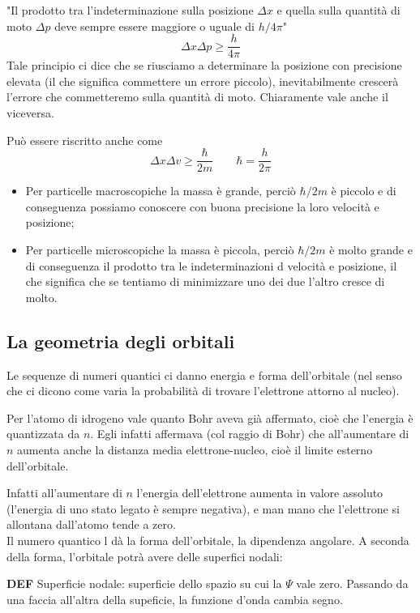 "Il prodotto tra l'indeterminazione sulla posizione $\Delta x$ e quella sulla quantità di moto $\Delta p$ deve sempre essere maggiore o uguale di $h/4\pi$"
$$\Delta x \Delta p \geq \frac{h}{4\pi}$$
Tale principio ci dice che se riusciamo a determinare la posizione con precisione elevata (il che significa commettere un errore piccolo), inevitabilmente crescerà l'errore che commetteremo sulla quantità di moto. Chiaramente vale anche il viceversa.

Può essere riscritto anche come
$$\Delta x \Delta v \geq \frac{\hbar}{2m} \qquad \hbar=\frac{h}{2\pi}$$
\begin{itemize}
  \item Per particelle macroscopiche la massa è grande, perciò $\hbar/2m$ è piccolo e di conseguenza possiamo conoscere con buona precisione la loro velocità e posizione;
  \item Per particelle microscopiche la massa è piccola, perciò $\hbar/2m$ è molto grande e di conseguenza il prodotto tra le indeterminazioni d velocità e posizione, il che significa che se tentiamo di minimizzare uno dei due l'altro cresce di molto.
\end{itemize}
\newpage
\subsection{La geometria degli orbitali}
Le sequenze di numeri quantici ci danno energia e forma dell'orbitale (nel senso che ci dicono come varia la probabilità di trovare l'elettrone attorno al nucleo).

Per l'atomo di idrogeno vale quanto Bohr aveva già affermato, cioè che l'energia è quantizzata da $n$. Egli infatti affermava (col raggio di Bohr) che all'aumentare di $n$ aumenta anche la distanza media elettrone-nucleo, cioè il limite esterno dell'orbitale.

Infatti all'aumentare di $n$ l'energia dell'elettrone aumenta in valore assoluto (l'energia di uno stato legato è sempre negativa), e man mano che l'elettrone si allontana dall'atomo tende a zero.\\

Il numero quantico l dà la forma dell'orbitale, la dipendenza angolare. A seconda della forma, l'orbitale potrà avere delle superfici nodali:

\textbf{DEF} Superficie nodale: superficie dello spazio su cui la $\Psi$ vale zero. Passando da una faccia all'altra della supeficie, la funzione d'onda cambia segno.

